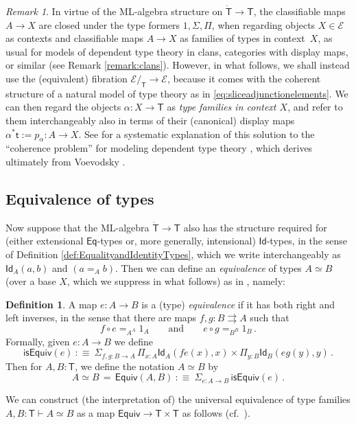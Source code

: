 \documentclass[12pt,reqno]{amsart}
\newcommand{\EE}{\ensuremath{\mathcal{E}}}
\renewcommand{\to}{\ensuremath{\rightarrow}}
\newcommand{\tto}{\ensuremath{\rightrightarrows}}
\newcommand{\Id}{\mathsf{Id}}
\renewcommand{\t}{\ensuremath{\mathsf{t}}}
\newcommand{\T}{\ensuremath{\mathsf{T}}}
\newcommand{\TT}{\ensuremath{\dot{\mathsf{T}}}}
\theoremstyle{remark}
\newtheorem{remark}[theorem]{Remark}
\theoremstyle{definition}
\newtheorem{definition}[theorem]{Definition}
\begin{document}
\begin{remark}\label{remark:classifyingmaps}
In virtue of the ML-algebra structure on $\TT\to\T$, the classifiable maps $A\to X$ are closed under the type formers $1, \Sigma, \Pi$, when  regarding objects $X \in \EE$ as contexts and classifiable maps $A\to X$ as families of types in context~$X$, as usual for models of dependent type theory in clans, categories with display maps, or similar (see Remark \ref{remark:clans}).  However, in what follows, we shall instead use the (equivalent) fibration $\EE/_\T \to \EE$, because it comes with the coherent structure of a natural model of type theory as in \eqref{eq:sliceadjunctionelements}.  We can then regard the objects $\alpha : X \to \T$ as \emph{type families in context $X$}, and refer to them interchangeably also in terms of their (canonical) display maps $\alpha^*\t := p_\alpha : A \to X$.  See \cite[\S 1--3]{AGH} for a systematic explanation of this solution to the ``coherence problem'' for modeling dependent type theory \cite{Hofmann:1994}, which derives ultimately from Voevodsky \cite{KL:VV}.  
\end{remark}

\subsection{Equivalence of types}\label{sec:equivalence}

Now suppose that the ML-algebra $\TT \to \T$ also has the structure required for (either extensional $\mathsf{Eq}$-types or, more generally, intensional) $\Id{}$-types, in the sense of Definition \ref{def:EqualityandIdentityTypes}, which we write interchangeably as $\Id_{A}(a, b)$ and $(a =_A b)$.  Then we can define an \emph{equivalence} of types $A\simeq B$ (over a base $X$, which we suppress in what follows) as in \cite[\S 4.3]{HoTTbook}, namely:
%
\begin{definition}
 A map $e : A\to B$ is a (type) \emph{equivalence} if it has both right and left inverses, in the sense that there are maps $f, g : B\tto A$ such that 
 \[
f\circ e =_{A^A} 1_A \qquad\text{and}\qquad  e\circ g =_{B^B} 1_B  \,.
 \]
 Formally, given $e : A\to B$ we define 
 \[
 \mathsf{isEquiv}(e)\ :\equiv\ \Sigma_{f, g: B\to A}\,  \Pi_{x:A}\Id_{A}(fe(x) , x) \times \Pi_{y:B}\Id_{B}(eg(y), y) \,.
 \]
Then for $A, B: \T$, we define the notation $A \simeq B$ by
 \[
A \simeq B\, =\, \mathsf{Equiv}(A,B)\ :\equiv\  \Sigma_{e : A\to B}\, \mathsf{isEquiv}(e)\,.
 \]
\end{definition}
We can construct (the interpretation of) the universal equivalence of type families $A, B : \T \vdash A \simeq B$ as a map $\mathsf{Equiv} \to \T \times \T$ as follows (cf.\ \cite{KL:VV}).
\end{document}
